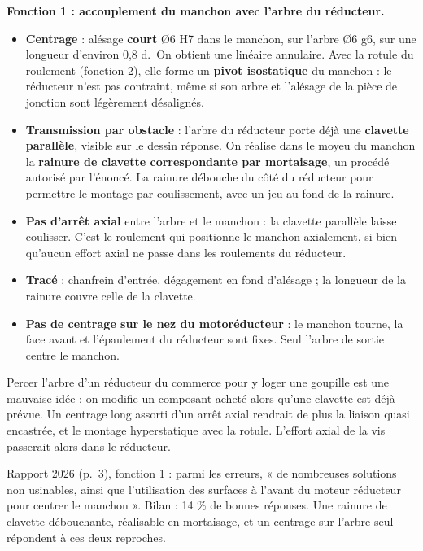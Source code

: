 \documentclass[11pt,a4paper]{article}
\providecommand{\tightlist}{\setlength{\itemsep}{0pt}\setlength{\parskip}{0pt}}
\begin{document}
\textbf{Fonction 1 : accouplement du manchon avec l'arbre du réducteur.}

\begin{itemize}
\tightlist
\item
  \textbf{Centrage} : alésage \textbf{court} Ø6 H7 dans le manchon, sur l'arbre Ø6 g6, sur une longueur d'environ 0,8 d.~On obtient une linéaire annulaire. Avec la rotule du roulement (fonction 2), elle forme un \textbf{pivot isostatique} du manchon : le réducteur n'est pas contraint, même si son arbre et l'alésage de la pièce de jonction sont légèrement désalignés.
\item
  \textbf{Transmission par obstacle} : l'arbre du réducteur porte déjà une \textbf{clavette parallèle}, visible sur le dessin réponse. On réalise dans le moyeu du manchon la \textbf{rainure de clavette correspondante par mortaisage}, un procédé autorisé par l'énoncé. La rainure débouche du côté du réducteur pour permettre le montage par coulissement, avec un jeu au fond de la rainure.
\item
  \textbf{Pas d'arrêt axial} entre l'arbre et le manchon : la clavette parallèle laisse coulisser. C'est le roulement qui positionne le manchon axialement, si bien qu'aucun effort axial ne passe dans les roulements du réducteur.
\item
  \textbf{Tracé} : chanfrein d'entrée, dégagement en fond d'alésage ; la longueur de la rainure couvre celle de la clavette.
\item
  \textbf{Pas de centrage sur le nez du motoréducteur} : le manchon tourne, la face avant et l'épaulement du réducteur sont fixes. Seul l'arbre de sortie centre le manchon.
\end{itemize}

\begin{piege}

Percer l'arbre d'un réducteur du commerce pour y loger une goupille est une mauvaise idée : on modifie un composant acheté alors qu'une clavette est déjà prévue. Un centrage long assorti d'un arrêt axial rendrait de plus la liaison quasi encastrée, et le montage hyperstatique avec la rotule. L'effort axial de la vis passerait alors dans le réducteur.

\end{piege}

\begin{jury}

Rapport 2026 (p.~3), fonction 1 : parmi les erreurs, « de nombreuses solutions non usinables, ainsi que l'utilisation des surfaces à l'avant du moteur réducteur pour centrer le manchon ». Bilan : 14 \% de bonnes réponses. Une rainure de clavette débouchante, réalisable en mortaisage, et un centrage sur l'arbre seul répondent à ces deux reproches.

\end{jury}
\end{document}
